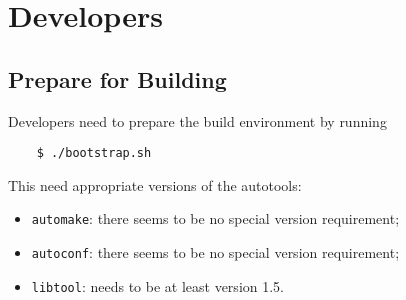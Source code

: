 \documentclass[10pt,dvips]{report}
\newcommand{\kw}[1]{\texttt{#1}}
\begin{document}
\begin{comment}
\paragraph{Run It!} \mbox{} \\
To test the system, one needs a test input file; the example
\kw{pendulum} in the subdirectory \kw{examples}
should do the trick.
\begin{itemize}
\item start Matlab
\item add the subdirectory \kw{contrib/SimulinkInterface} to Matlab's
path, by executing
\begin{verbatim}
    > path('<path/to>/contrib/SimulinkInterface', path);
\end{verbatim}
\item execute simulink by clicking on the related icon, or by running
\begin{verbatim}
    > simulink
\end{verbatim}
\item open the model by clicking \kw{File->Open} on the menubar
\item run the model by clicking \kw{Simulation->Start} on the menubar.
some times, the first run fails; we're still trying to track that down.
In case, just try again...
\item for more details on creating your own model, or on editing
the interface parameters, refer to the \kw{README}
in \kw{contrib/SimulinkInterface}
\end{itemize}

\end{comment}




\chapter{Developers}

\section{Prepare for Building}
Developers need to prepare the build environment by running
\begin{verbatim}
    $ ./bootstrap.sh
\end{verbatim}
This need appropriate versions of the autotools:
\begin{itemize}
\item \kw{automake}: there seems to be no special version requirement;
\item \kw{autoconf}: there seems to be no special version requirement;
\item \kw{libtool}: needs to be at least version 1.5.
\end{itemize}



\end{document}
